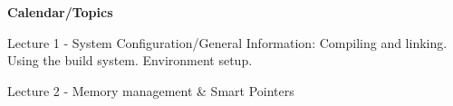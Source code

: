 \documentclass[10pt]{article}
\begin{document}
\textbf{Calendar/Topics}
\hangindent=1cm

Lecture 1 - System Configuration/General Information: Compiling and linking. Using the build system. Environment setup.

Lecture 2 - Memory management \& Smart Pointers
\end{document}
